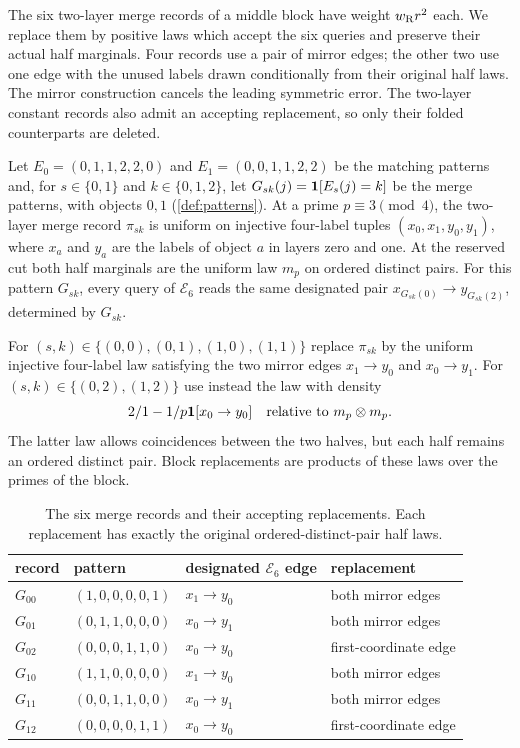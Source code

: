 The six two-layer merge records of a middle block have weight
$w_{\rm R}r^2$ each. We replace them by positive laws which accept the six
queries and preserve their actual half marginals. Four records use a pair
of mirror edges; the other two use one edge with the unused labels drawn
conditionally from their original half laws. The mirror construction cancels
the leading symmetric error. The two-layer constant records also admit an
accepting replacement, so only their folded counterparts are deleted.

\begin{definition}\label{def:merge-records}
Let $E_0=(0,1,1,2,2,0)$ and $E_1=(0,0,1,1,2,2)$ be the matching patterns and,
for $s\in\{0,1\}$ and $k\in\{0,1,2\}$, let
$G_{sk}(j)=\mathbf 1[E_s(j)=k]$ be the merge patterns, with objects $0,1$
(\cref{def:patterns}). At a prime $p\equiv3\pmod4$, the two-layer merge
record $\pi_{sk}$ is uniform on injective four-label tuples
$(x_0,x_1,y_0,y_1)$, where $x_a$ and $y_a$ are the labels of object $a$
in layers zero and one. At the reserved cut both half marginals are the
uniform law $m_p$ on ordered distinct pairs. For this pattern
$G_{sk}$, every query of $\mathcal E_6$ reads the same designated
pair $x_{G_{sk}(0)}\to y_{G_{sk}(2)}$, determined by $G_{sk}$.

For $(s,k)\in\{(0,0),(0,1),(1,0),(1,1)\}$ replace $\pi_{sk}$ by the
uniform injective four-label law satisfying the two mirror edges
$x_1\to y_0$ and $x_0\to y_1$. For $(s,k)\in\{(0,2),(1,2)\}$ use instead
the law with density
\[
 2/1-1/p\mathbf 1[x_0\to y_0]
 \quad\hbox{relative to }m_p\otimes m_p.
\]
The latter law allows coincidences between the two halves, but each half
remains an ordered distinct pair. Block replacements are products of
these laws over the primes of the block.
\end{definition}

\begin{table}[ht]
\centering\small
\begin{tabular}{@{}llll@{}}
\toprule
record & pattern & designated $\mathcal E_6$ edge & replacement\\
\midrule
$G_{00}$ & $(1,0,0,0,0,1)$ & $x_1\to y_0$ & both mirror edges\\
$G_{01}$ & $(0,1,1,0,0,0)$ & $x_0\to y_1$ & both mirror edges\\
$G_{02}$ & $(0,0,0,1,1,0)$ & $x_0\to y_0$ & first-coordinate edge\\
$G_{10}$ & $(1,1,0,0,0,0)$ & $x_1\to y_0$ & both mirror edges\\
$G_{11}$ & $(0,0,1,1,0,0)$ & $x_0\to y_1$ & both mirror edges\\
$G_{12}$ & $(0,0,0,0,1,1)$ & $x_0\to y_0$ & first-coordinate edge\\
\bottomrule
\end{tabular}
\caption{The six merge records and their accepting replacements. Each
replacement has exactly the original ordered-distinct-pair half laws.}
\label{tab:merge-records}
\end{table}

